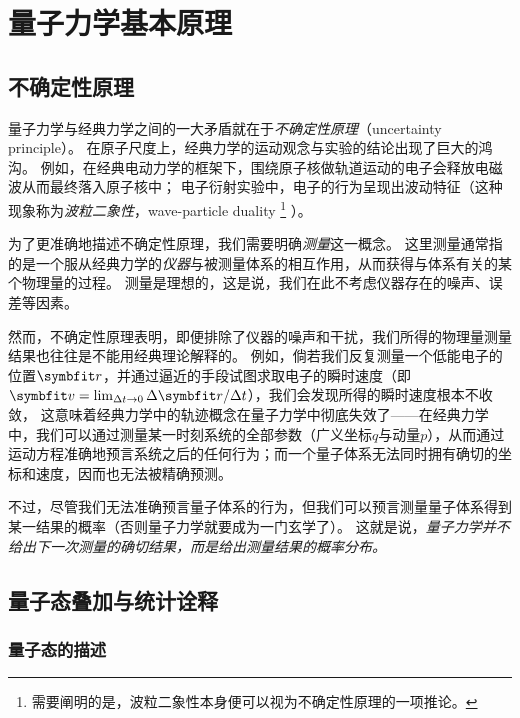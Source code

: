 
\section{量子力学基本原理}
\label{sec:principles}

\subsection{不确定性原理}
\label{subsec:principles_uncertainty}

量子力学与经典力学之间的一大矛盾就在于\emph{不确定性原理}（uncertainty principle）。
在原子尺度上，经典力学的运动观念与实验的结论出现了巨大的鸿沟。
例如，在经典电动力学的框架下，围绕原子核做轨道运动的电子会释放电磁波从而最终落入原子核中；
电子衍射实验中，电子的行为呈现出波动特征（这种现象称为\emph{波粒二象性}，wave-particle duality
\footnote{需要阐明的是，波粒二象性本身便可以视为不确定性原理的一项推论。}
）。

为了更准确地描述不确定性原理，我们需要明确\emph{测量}这一概念。
这里测量通常指的是一个服从经典力学的\emph{仪器}与被测量体系的相互作用，从而获得与体系有关的某个物理量的过程。
测量是理想的，这是说，我们在此不考虑仪器存在的噪声、误差等因素。

然而，不确定性原理表明，即便排除了仪器的噪声和干扰，我们所得的物理量测量结果也往往是不能用经典理论解释的。
例如，倘若我们反复测量一个低能电子的位置$\rr$，并通过逼近的手段试图求取电子的瞬时速度（即$\bm{v}=\lim_{\Delta t\rightarrow 0}\Delta\rr/\Delta t$），我们会发现所得的瞬时速度根本不收敛，
这意味着经典力学中的轨迹概念在量子力学中彻底失效了——在经典力学中，我们可以通过测量某一时刻系统的全部参数（广义坐标$q$与动量$p$），从而通过运动方程准确地预言系统之后的任何行为；而一个量子体系无法同时拥有确切的坐标和速度，因而也无法被精确预测。

不过，尽管我们无法准确预言量子体系的行为，但我们可以预言测量量子体系得到某一结果的概率（否则量子力学就要成为一门玄学了）。
这就是说，\emph{量子力学并不给出下一次测量的确切结果，而是给出测量结果的概率分布。}


\subsection{量子态叠加与统计诠释}
\label{subsec:principles_quantum_state}

\subsubsection{量子态的描述}

